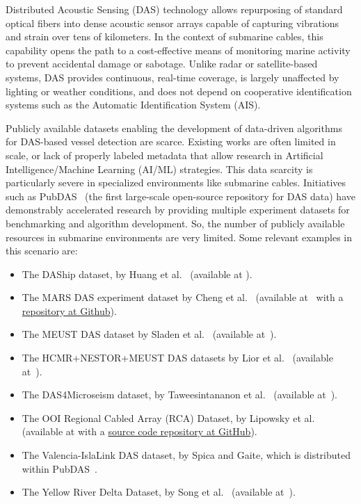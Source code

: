 \documentclass[11pt]{article}
\begin{document}
Distributed Acoustic Sensing (DAS) technology allows repurposing of standard optical fibers into dense acoustic sensor arrays capable of capturing vibrations and strain over tens of kilometers. In the context of submarine cables, this capability opens the path to a cost-effective means of monitoring marine activity to prevent accidental damage or sabotage. Unlike radar or satellite-based systems, DAS provides continuous, real-time coverage, is largely unaffected by lighting or weather conditions, and does not depend on cooperative identification systems such as the Automatic Identification System (AIS).

Publicly available datasets enabling the development of data-driven algorithms for DAS-based vessel detection are scarce. Existing works are often limited in scale, or lack of properly labeled metadata that allow research in Artificial Intelligence/Machine Learning (AI/ML) strategies. This data scarcity is particularly severe in specialized environments like submarine cables. Initiatives such as PubDAS~\cite{pubDAS2023} (the first large-scale open-source repository for DAS data) have demonstrably accelerated research by providing multiple experiment datasets for benchmarking and algorithm development. So, the number of publicly available resources in submarine environments are very limited. Some relevant examples in this scenario are:

\begin{itemize}
  \item The DAShip dataset, by Huang et al.~\cite{Huang2025DAShip} (available at \cite{DAShip2025}).
  \item The MARS DAS experiment dataset by Cheng et al.~\cite{cheng2021utilizing} (available at~\cite{cheng2020mbari_das_data} with a \href{https://github.com/njlindsey/Photonic-seismology-in-Monterey-Bay-Dark-fiber1DAS-illuminates-offshore-faults-and-coastal-ocean}{repository at Github}).
  \item The MEUST DAS dataset by Sladen et al.~\cite{sladen2019distributed} (available at~\cite{sladen2019meust_km3net_das}).
  \item The HCMR+NESTOR+MEUST DAS datasets by Lior et al.~\cite{lior2021detection} (available at~\cite{lior2021detection_dataset}).
  \item The DAS4Microseism dataset, by Taweesintananon et al.~\cite{Taweesintananon2023} (available at~\cite{VPRD2H_2022}).
  \item The OOI Regional Cabled Array (RCA) Dataset, by Lipowsky et al.~\cite{shi2025multiplexed} (available at \cite{lipovsky2024rapid_das_ooi} with a \href{https://github.com/uwfiberlab/OOI_DAS_2024}{source code repository at GitHub}).
  \item The Valencia-IslaLink DAS dataset, by Spica and Gaite, which is distributed within PubDAS~\cite{pubDAS2023}.\item The Yellow River Delta Dataset, by Song et al.~\cite{song2024near} (available at~\cite{song_2024_dataset}).
\end{itemize}
\end{document}
